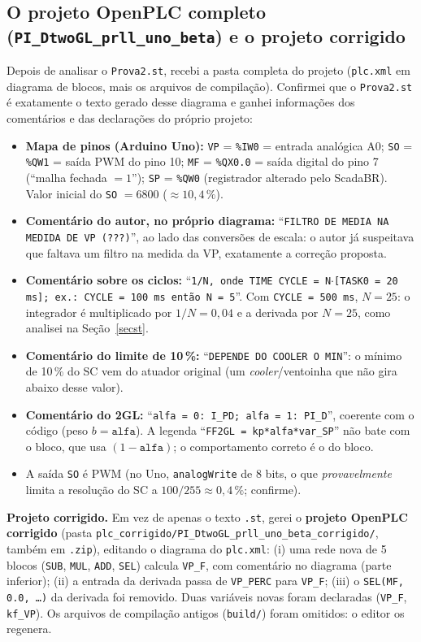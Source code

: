 \subsection{O projeto OpenPLC completo (\texttt{PI\_DtwoGL\_prll\_uno\_beta}) e o projeto corrigido}\label{projplc}
Depois de analisar o \texttt{Prova2.st}, recebi a pasta completa do projeto (\texttt{plc.xml} em diagrama de blocos, mais os arquivos de compilação). Confirmei que o \texttt{Prova2.st} é exatamente o texto gerado desse diagrama e ganhei informações dos comentários e das declarações do próprio projeto:
\begin{itemize}
\item \textbf{Mapa de pinos (Arduino Uno):} \texttt{VP} = \texttt{\%IW0} = entrada analógica A0; \texttt{SO} = \texttt{\%QW1} = saída PWM do pino 10; \texttt{MF} = \texttt{\%QX0.0} = saída digital do pino 7 (``malha fechada $=1$''); \texttt{SP} = \texttt{\%QW0} (registrador alterado pelo ScadaBR). Valor inicial do \texttt{SO} $=6800$ ($\approx10{,}4\,\%$).
\item \textbf{Comentário do autor, no próprio diagrama:} ``\texttt{FILTRO DE MEDIA NA MEDIDA DE VP (???)}'', ao lado das conversões de escala: o autor já suspeitava que faltava um filtro na medida da VP, exatamente a correção proposta.
\item \textbf{Comentário sobre os ciclos:} ``\texttt{1/N, onde TIME CYCLE = N$\cdot$[TASK0 = 20 ms]; ex.: CYCLE = 100 ms então N = 5}''. Com \texttt{CYCLE = 500 ms}, $N=25$: o integrador é multiplicado por $1/N=0{,}04$ e a derivada por $N=25$, como analisei na Seção~\ref{secst}.
\item \textbf{Comentário do limite de 10\,\%:} ``\texttt{DEPENDE DO COOLER O MIN}'': o mínimo de 10\,\% do SC vem do atuador original (um \emph{cooler}/ventoinha que não gira abaixo desse valor).
\item \textbf{Comentário do 2GL:} ``\texttt{alfa = 0: I\_PD; alfa = 1: PI\_D}'', coerente com o código (peso $b=\mathtt{alfa}$). A legenda ``\texttt{FF2GL = kp*alfa*var\_SP}'' não bate com o bloco, que usa $(1-\mathtt{alfa})$; o comportamento correto é o do bloco.
\item A saída \texttt{SO} é PWM (no Uno, \texttt{analogWrite} de 8 bits, o que \emph{provavelmente} limita a resolução do SC a $100/255\approx0{,}4\,\%$; confirme).
\end{itemize}
\textbf{Projeto corrigido.} Em vez de apenas o texto \texttt{.st}, gerei o \textbf{projeto OpenPLC corrigido} (pasta \texttt{plc\_corrigido/PI\_DtwoGL\_prll\_uno\_beta\_corrigido/}, também em \texttt{.zip}), editando o diagrama do \texttt{plc.xml}: (i) uma rede nova de 5 blocos (\texttt{SUB}, \texttt{MUL}, \texttt{ADD}, \texttt{SEL}) calcula \texttt{VP\_F}, com comentário no diagrama (parte inferior); (ii) a entrada da derivada passa de \texttt{VP\_PERC} para \texttt{VP\_F}; (iii) o \texttt{SEL(MF, 0.0, \ldots)} da derivada foi removido. Duas variáveis novas foram declaradas (\texttt{VP\_F}, \texttt{kf\_VP}). Os arquivos de compilação antigos (\texttt{build/}) foram omitidos: o editor os regenera.
